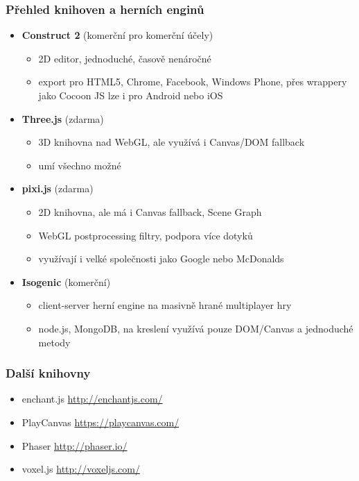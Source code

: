 \documentclass{beamer}
\begin{document}
		\begin{frame}[t,fragile]
		\frametitle{Přehled knihoven a herních enginů}					
		\begin{itemize}
		
		\item \textbf{Construct 2} (komerční pro komerční účely)
		\begin{itemize}
			\item 2D editor, jednoduché, časově nenáročné
			\item export pro HTML5, Chrome, Facebook, Windows Phone, přes wrappery jako Cocoon JS lze i pro Android nebo iOS
		\end{itemize}				
		\item \textbf{Three.js} (zdarma)
		\begin{itemize}
			\item 3D knihovna nad WebGL, ale využívá i Canvas/DOM fallback
			\item umí všechno možné			
		\end{itemize}				
		\item \textbf{pixi.js} (zdarma)
		\begin{itemize}
			\item 2D knihovna, ale má i Canvas fallback, Scene Graph
			\item WebGL postprocessing filtry, podpora více dotyků
			\item využívají i velké společnosti jako Google nebo McDonalds		
		\end{itemize}						
		\item \textbf{Isogenic} (komerční)
		\begin{itemize}
			\item client-server herní engine na masivně hrané multiplayer hry
			\item node.js, MongoDB, na kreslení využívá pouze DOM/Canvas a jednoduché metody		
		\end{itemize}				
		\end{itemize}	

	\end{frame}
	
	
	
		\begin{frame}[t,fragile]
		\frametitle{Další knihovny}					
		\begin{itemize}
				\item enchant.js \url{http://enchantjs.com/}
	\item PlayCanvas \url{https://playcanvas.com/}
	\item Phaser \url{http://phaser.io/}
	\item voxel.js \url{http://voxeljs.com/}
		\end{itemize}	

	\end{frame}
	
\end{document}
